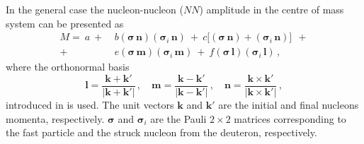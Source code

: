 \documentclass[twocolumn,epjc3]{svjour3}
\begin{document}
In the general case the nucleon-nucleon ($NN$) amplitude in the centre of mass
system can be presented as \cite{gla02}
\begin{equation}
  \label{eq:mat_full}
  \begin{split}
    M =\ a\ +\ &b
    (\boldsymbol{\sigma}\,\mathbf{n})
    (\boldsymbol{\sigma}_i\,\mathbf{n})\ +\ c\bigl[
    (\boldsymbol{\sigma}\,\mathbf{n}) +
    (\boldsymbol{\sigma}_i\,\mathbf{n})\bigr]\ \ + \\
    +\ &e
    (\boldsymbol{\sigma}\,\mathbf{m})
    (\boldsymbol{\sigma}_i\,\mathbf{m})\ +\ f
    (\boldsymbol{\sigma}\,\mathbf{l})
    (\boldsymbol{\sigma}_i\,\mathbf{l})\,,
  \end{split}
\end{equation}
where the orthonormal basis
\begin{equation}
  \mathbf{l} =
  \frac{\mathbf{k} + \mathbf{k}'}{|\mathbf{k} + \mathbf{k}'|}\,, \quad
  \mathbf{m} =
  \frac{\mathbf{k} - \mathbf{k}'}{|\mathbf{k} - \mathbf{k}'|}\,, \quad
  \mathbf{n} =
  \frac{\mathbf{k} \times \mathbf{k}'}{|\mathbf{k} \times \mathbf{k}'|}\,,
\end{equation}
introduced in \cite{gol66} is used. The unit vectors $\mathbf{k}$ and
$\mathbf{k}'$ are the initial and final nucleons momenta, respectively.
$\boldsymbol{\sigma}$ and $\boldsymbol{\sigma}_i$ are the Pauli $2\times2$
matrices corresponding to the fast particle and the struck nucleon from the
deuteron, respectively.

\end{document}

